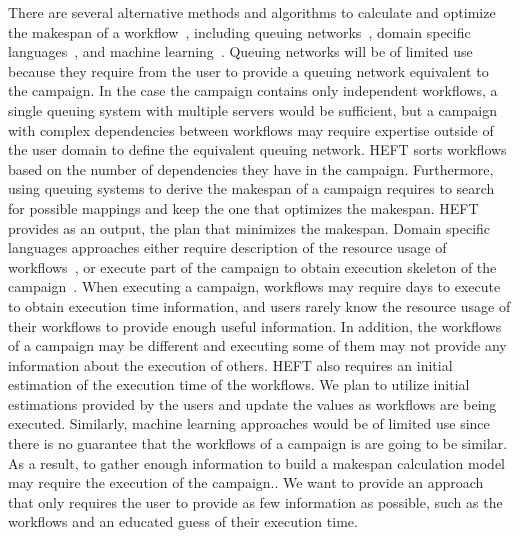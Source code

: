 There are several alternative methods and algorithms to calculate and optimize the makespan of a workflow~\cite{lu2019review}, including queuing networks~\cite{yao2019throughput,bao2019performance}, domain specific languages~\cite{carothers2017durango,maheshwari2016workflow}, and machine learning~\cite{witt2019predictive,pumma2017runtime}.
Queuing networks will be of limited use because they require from the user to provide a queuing network equivalent to the campaign.
In the case the campaign contains only independent workflows, a single queuing system with multiple servers would be sufficient, but a campaign with complex dependencies between workflows may require expertise outside of the user domain to define the equivalent queuing network.
HEFT sorts workflows based on the number of dependencies they have in the campaign.
Furthermore, using queuing systems to derive the makespan of a campaign requires to search for possible mappings and keep the one that optimizes the makespan.
HEFT provides as an output, the plan that minimizes the makespan.
Domain specific languages approaches either require description of the resource usage of workflows~\cite{carothers2017durango}, or execute part of the campaign to obtain execution skeleton of the campaign~\cite{maheshwari2016workflow}.
When executing a campaign, workflows may require days to execute to obtain execution time information, and users rarely know the resource usage of their workflows to provide enough useful information.
In addition, the workflows of a campaign may be different and executing some of them may not provide any information about the execution of others.
HEFT also requires an initial estimation of the execution time of the workflows. We plan to utilize initial estimations provided by the users and update the values as workflows are being executed.
Similarly, machine learning approaches would be of limited use since there is no guarantee that the workflows of a campaign is are going to be similar.
As a result, to gather enough information to build a makespan calculation model may require the execution of the campaign..
We want to provide an approach that only requires the user to provide as few information as possible, such as the workflows and an educated guess of their execution time.

